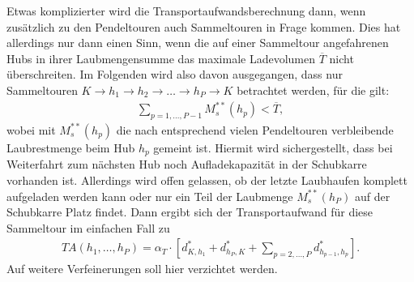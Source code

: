\documentclass[fontsize=12pt,doubleside,openany,listof=totoc,listof=flat,listof=nochaptergap,numbers=noenddot]{article}
\begin{document}
Etwas komplizierter wird die Transportaufwandsberechnung dann, wenn zusätzlich zu den Pendeltouren auch Sammeltouren in Frage kommen. Dies hat allerdings nur dann einen Sinn, wenn die auf einer Sammeltour angefahrenen Hubs in ihrer Laubmengensumme das maximale Ladevolumen $\overline{T}$ nicht überschreiten. Im Folgenden wird also davon
ausgegangen, dass nur Sammeltouren $K \rightarrow h_1 \rightarrow h_2 \rightarrow \ldots \rightarrow h_P \rightarrow K$ betrachtet werden, für die gilt:
\begin{align*}
\sum_{p=1,\ldots,P-1}{M^{**}_s(h_p)}< \overline{T},
\end{align*}
wobei mit $M^{**}_s(h_p)$ die nach entsprechend vielen Pendeltouren verbleibende Laubrestmenge\label{Laubrestmenge} beim Hub $h_p$ gemeint ist. Hiermit wird sichergestellt, dass bei Weiterfahrt zum nächsten Hub noch Aufladekapazität in der Schubkarre vorhanden ist. Allerdings wird offen gelassen, ob der letzte Laubhaufen komplett aufgeladen werden kann 
oder nur ein Teil der Laubmenge $M^{**}_s(h_P)$ auf der Schubkarre Platz findet. Dann ergibt sich der Transportaufwand für diese Sammeltour im einfachen Fall zu
\begin{align*}
TA(h_1,\ldots,h_P)=\alpha_T \cdot 
[d^*_{K,h_1} + d^*_{h_P,K}+\sum_{p=2,\dots,P} d^*_{h_{p-1},h_p}].
\end{align*}
Auf weitere Verfeinerungen soll hier verzichtet werden.\\
\end{document}
